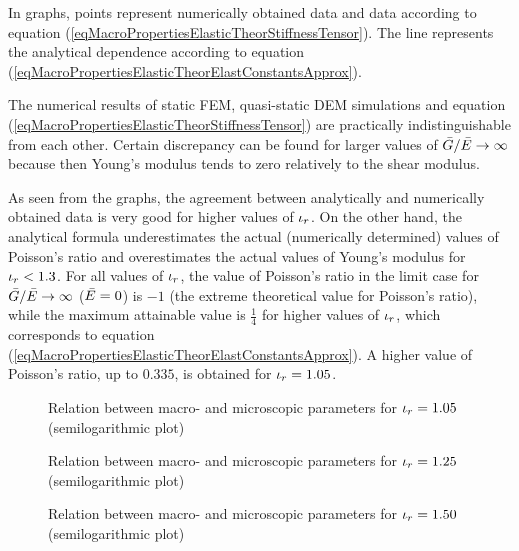 In graphs, points represent numerically obtained data and data according to equation (\ref{eqMacroPropertiesElasticTheorStiffnessTensor}).
The line represents the analytical dependence according to equation (\ref{eqMacroPropertiesElasticTheorElastConstantsApprox}).

The numerical results of static FEM, quasi-static DEM simulations and equation (\ref{eqMacroPropertiesElasticTheorStiffnessTensor}) are practically indistinguishable from each other.
Certain discrepancy can be found for larger values of $\linkMaterialStiffnessShear/\linkMaterialStiffnessNormal\to\infty$ because
then Young's modulus tends to zero relatively to the shear modulus.

As seen from the graphs, the agreement between analytically and numerically obtained data is very good for higher values of $\iota_r$.
On the other hand, the analytical formula underestimates the actual (numerically determined) values of Poisson's ratio and overestimates the actual values of Young's modulus for $\iota_r<1{.}3$.
For all values of $\iota_r$, the value of Poisson's ratio in the limit case for $\linkMaterialStiffnessShear/\linkMaterialStiffnessNormal\to\infty$ ($\linkMaterialStiffnessNormal=0$) is $-1$ (the extreme theoretical value for Poisson's ratio), while the maximum attainable value is $\frac{1}{4}$ for higher values of $\iota_r$, which corresponds to equation (\ref{eqMacroPropertiesElasticTheorElastConstantsApprox}).
A higher value of Poisson's ratio, up to $0{.}335$, is obtained for $\interactionRatio=1{.}05$.

\begin{figure}
	\centering
	\caption[Relation between macro- and microscopic parameters for $\interactionRatio=1{.}05$]{Relation between macro- and microscopic parameters for $\interactionRatio=1{.}05$ (semilogarithmic plot)}
\end{figure}

\begin{figure}
	\centering
	\caption[Relation between macro- and microscopic parameters for $\interactionRatio=1{.}25$]{Relation between macro- and microscopic parameters for $\interactionRatio=1{.}25$ (semilogarithmic plot)}
\end{figure}

\begin{figure}
	\centering
	\caption[Relation between macro- and microscopic parameters for $\interactionRatio=1{.}50$]{Relation between macro- and microscopic parameters for $\interactionRatio=1{.}50$ (semilogarithmic plot)}
\end{figure}


